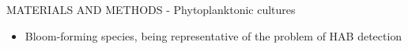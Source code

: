 \documentclass[handout]{beamer}
\newcommand\Fontable{\fontsize{9}{10}\selectfont}
\begin{document}
\begin{frame}{MATERIALS AND METHODS - Phytoplanktonic cultures}
\begin{minipage}[c]{1\linewidth}
\begin{minipage}[c]{0.7\linewidth}
\begin{itemize}
	\Fontable
	\item<3-> Bloom-forming species, being representative of the problem of HAB detection
\end{itemize}
\end{minipage}
\begin{minipage}[c]{0.29\linewidth}
\end{minipage}
\end{minipage}

\end{frame}
\end{document}
